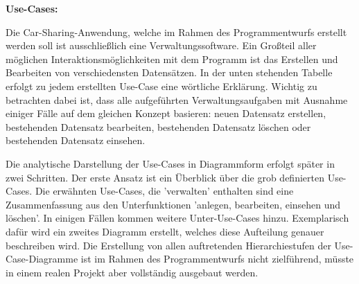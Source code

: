 \newpage

\textbf{Use-Cases:}


Die Car-Sharing-Anwendung, welche im Rahmen des Programmentwurfs erstellt werden soll ist ausschließlich eine Verwaltungssoftware. Ein Großteil aller möglichen Interaktionsmöglichkeiten mit dem Programm ist das Erstellen und Bearbeiten von verschiedensten Datensätzen. 
In der unten stehenden Tabelle erfolgt zu jedem erstellten Use-Case eine wörtliche Erklärung. Wichtig zu betrachten dabei ist, dass alle aufgeführten Verwaltungsaufgaben mit Ausnahme einiger Fälle auf dem gleichen Konzept basieren: neuen Datensatz erstellen, bestehenden Datensatz bearbeiten, bestehenden Datensatz löschen oder bestehenden Datensatz einsehen.

Die analytische Darstellung der Use-Cases in Diagrammform erfolgt später in zwei Schritten. Der erste Ansatz ist ein  Überblick über die grob definierten Use-Cases. Die erwähnten Use-Cases, die 'verwalten' enthalten sind eine Zusammenfassung aus den Unterfunktionen 'anlegen, bearbeiten, einsehen und löschen'. In einigen Fällen kommen weitere Unter-Use-Cases hinzu. Exemplarisch dafür wird ein zweites Diagramm erstellt, welches diese Aufteilung genauer beschreiben wird. Die Erstellung von allen auftretenden Hierarchiestufen der Use-Case-Diagramme ist im Rahmen des Programmentwurfs nicht zielführend, müsste in einem realen Projekt aber vollständig ausgebaut werden. 

\newpage

